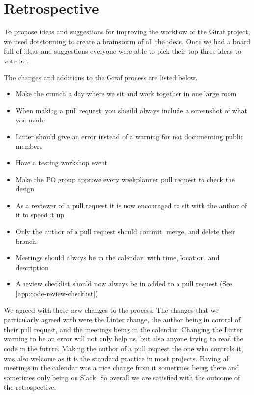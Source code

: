\section{Retrospective}
To propose ideas and suggestions for improving the workflow of the Giraf project, we used \href{https://dotstorming.com/}{dotstorming} to create a brainstorm of all the ideas. 
Once we had a board full of ideas and suggestions everyone were able to pick their top three ideas to vote for.

The changes and additions to the Giraf process are listed below.

\begin{itemize}
  \item Make the crunch a day where we sit and work together in one large room
  \item When making a pull request, you should always include a screenshot of what you made
  \item Linter should give an error instead of a warning for not documenting public members
  \item Have a testing workshop event
  \item Make the PO group approve every weekplanner pull request to check the design
  \item As a reviewer of a pull request it is now encouraged to sit with the author of it to speed it up
  \item Only the author of a pull request should commit, merge, and delete their branch.
  \item Meetings should always be in the calendar, with time, location, and description
  \item A review checklist should now always be in added to a pull request (See \autoref{app:code-review-checklist})
\end{itemize}

We agreed with these new changes to the process.
The changes that we particularly agreed with were the Linter change, the author being in control of their pull request, and the meetings being in the calendar.
Changing the Linter warning to be an error will not only help us, but also anyone trying to read the code in the future.
Making the author of a pull request the one who controls it, was also welcome as it is the standard practice in most projects.
Having all meetings in the calendar was a nice change from it sometimes being there and sometimes only being on Slack.
So overall we are satisfied with the outcome of the retrospective.
